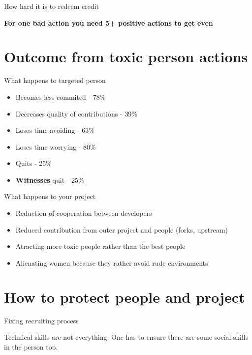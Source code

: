 \documentclass{beamer}
\begin{document}
\begin{frame}{How hard it is to redeem credit}
	\begin{center}
	\textbf{For one bad action you need 5+ positive actions to get even}
	\end{center}
\end{frame}

\section{Outcome from toxic person actions}

\begin{frame}[t]{What happens to targeted person}
	\begin{itemize}
	\item Becomes less commited - 78\%
	\item Decreases quality of contributions - 39\%
	\item Loses time avoiding - 63\%
	\item Loses time worrying - 80\%
	\item Quits - 25\%
	\item \textbf{Witnesses} quit - 25\%
	\end{itemize}
\end{frame}

\begin{frame}[t]{What happens to your project}
	\begin{itemize}
	\item Reduction of cooperation between developers
	\item Reduced contribution from outer project and people (forks, upstream)
	\item Atracting more toxic people rather than the best people
	\item Alienating women because they rather avoid rude environments
	\end{itemize}
\end{frame}

\section{How to protect people and project}

\begin{frame}{Fixing recruiting process}
	\begin{center}
	Technical skills are not everything. One has to ensure there are some social skills in the person too.
	\end{center}
\end{frame}
\end{document}
